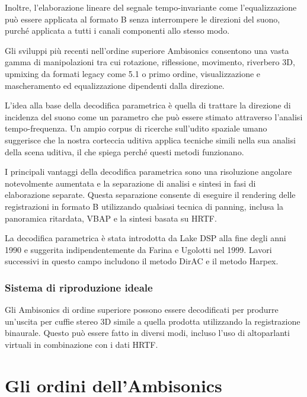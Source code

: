       Inoltre, l'elaborazione lineare del segnale tempo-invariante come l'equalizzazione può essere applicata al formato B senza interrompere le direzioni del suono, purché applicata a tutti i canali componenti allo stesso modo.
      
      Gli sviluppi più recenti nell'ordine superiore Ambisonics consentono una vasta gamma di manipolazioni tra cui rotazione, riflessione,
       movimento, riverbero 3D, upmixing da formati legacy come 5.1 o primo ordine, visualizzazione e mascheramento ed equalizzazione dipendenti dalla direzione.

       L'idea alla base della decodifica parametrica è quella di trattare la direzione di incidenza del suono come un parametro che può essere stimato attraverso l'analisi tempo-frequenza. 
       Un ampio corpus di ricerche sull'udito spaziale umano suggerisce che la nostra corteccia uditiva applica tecniche simili nella sua analisi della scena uditiva, il che spiega perché questi metodi funzionano.

       I principali vantaggi della decodifica parametrica sono una risoluzione angolare notevolmente aumentata e la separazione di analisi e sintesi in fasi di elaborazione separate. 
       Questa separazione consente di eseguire il rendering delle registrazioni in formato B utilizzando qualsiasi tecnica di panning, inclusa la panoramica ritardata, VBAP e la sintesi basata su HRTF.
       
       La decodifica parametrica è stata introdotta da Lake DSP alla fine degli anni 1990 e suggerita indipendentemente da Farina e Ugolotti nel 1999. Lavori successivi in questo campo includono il metodo DirAC e il metodo Harpex.

       \subsubsection*{Sistema di riproduzione ideale}

       Gli Ambisonics di ordine superiore possono essere decodificati per produrre un'uscita per cuffie stereo 3D simile a quella prodotta utilizzando la registrazione binaurale.
       Questo può essere fatto in diversi modi, incluso l'uso di altoparlanti virtuali in combinazione con i dati HRTF.

      \section{Gli ordini dell'Ambisonics}

